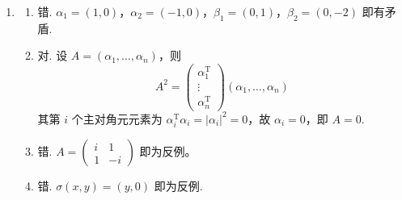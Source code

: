 \begin{enumerate}
    \item
    \begin{enumerate}
        \item 错. \(\alpha_{1}=(1,0)\)，\(\alpha_{2}=(-1,0)\)，\(\beta_{1}=(0,1)\)，\(\beta_{2}=(0,-2)\) 即有矛盾.
        \item 对. 设 \(A = (\alpha_{1}, \ldots, \alpha_{n})\)，则
        \[
        A^{2}=\begin{pmatrix}
            \alpha_{1}^\mathrm{T} \\
            \vdots \\
            \alpha_{n}^\mathrm{T}
        \end{pmatrix}\left(\alpha_{1}, \ldots, \alpha_{n}\right)
        \]
        其第 \(i\) 个主对角元元素为 \(\alpha_{i}^\mathrm{T}\alpha_{i}=\vert\alpha_{i}\vert^{2}=0\)，故 \(\alpha_{i}=0\)，即 \(A = 0\).
        \item 错. \(A=\begin{pmatrix}
        i & 1 \\
        1 & -i
        \end{pmatrix}\) 即为反例。
        \item 错. \(\sigma(x, y)=(y, 0)\) 即为反例.
    \end{enumerate}
\end{enumerate}

\clearpage
